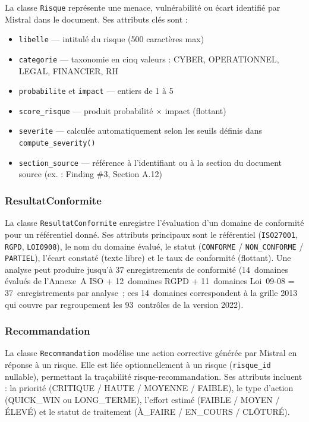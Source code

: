 \documentclass[a4paper,12pt,oneside]{report}
\begin{document}
	La classe \texttt{Risque} représente une menace, vulnérabilité ou écart
	identifié par Mistral dans le document. Ses attributs clés sont :
	\begin{itemize}
		\item \texttt{libelle} — intitulé du risque (500 caractères max)
		\item \texttt{categorie} — taxonomie en cinq valeurs : CYBER,
		OPERATIONNEL, LEGAL, FINANCIER, RH
		\item \texttt{probabilite} et \texttt{impact} — entiers de 1 à 5
		\item \texttt{score\_risque} — produit probabilité × impact (flottant)
		\item \texttt{severite} — calculée automatiquement selon les seuils
		définis dans \texttt{compute\_severity()}
		\item \texttt{section\_source} — référence à l'identifiant ou à la
		section du document source (ex. : \og{}Finding \#3\fg{},
		\og{}Section A.12\fg{})
	\end{itemize}
	
	\subsubsection*{ResultatConformite}
	
	La classe \texttt{ResultatConformite} enregistre l'évaluation d'un domaine
	de conformité pour un référentiel donné. Ses attributs principaux sont
	le référentiel (\texttt{ISO27001}, \texttt{RGPD}, \texttt{LOI0908}), le
	nom du domaine évalué, le statut (\texttt{CONFORME} / \texttt{NON\_CONFORME}
	/ \texttt{PARTIEL}), l'écart constaté (texte libre) et le taux de
	conformité (flottant). Une analyse peut produire jusqu'à 37 enregistrements
	de conformit\'e (14~domaines \'evalu\'es de l'Annexe~A ISO + 12~domaines RGPD + 11~domaines Loi~09-08 = 37~enregistrements par analyse~; ces 14~domaines correspondent \`a la grille 2013 qui couvre par regroupement les 93~contr\^oles de la version 2022).
	
	\subsubsection*{Recommandation}
	
	La classe \texttt{Recommandation} modélise une action corrective générée
	par Mistral en réponse à un risque. Elle est liée optionnellement à un
	risque (\texttt{risque\_id} nullable), permettant la traçabilité
	risque-recommandation. Ses attributs incluent : la priorité (CRITIQUE /
	HAUTE / MOYENNE / FAIBLE), le type d'action (QUICK\_WIN ou LONG\_TERME),
	l'effort estimé (FAIBLE / MOYEN / ÉLEVÉ) et le statut de traitement
	(À\_FAIRE / EN\_COURS / CLÔTURÉ).
	
\end{document}
